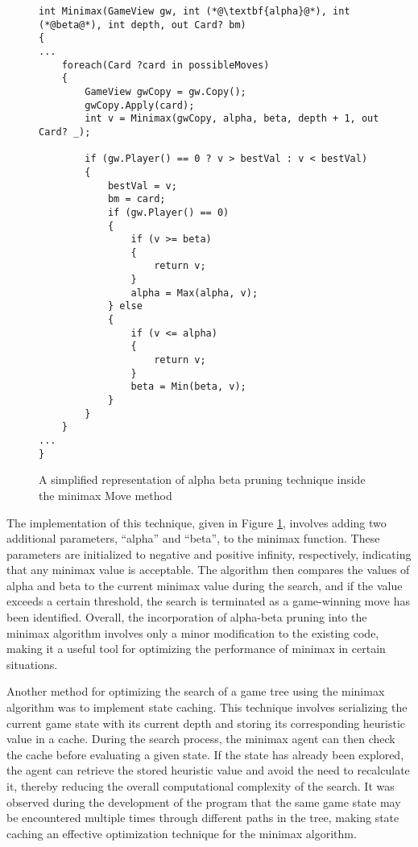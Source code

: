 \begin{figure}[h]
\captionsetup{justification=centering}
\begin{lstlisting}
int Minimax(GameView gw, int (*@\textbf{alpha}@*), int (*@beta@*), int depth, out Card? bm)
{
...
	foreach(Card ?card in possibleMoves)
	{
		GameView gwCopy = gw.Copy();
		gwCopy.Apply(card);
		int v = Minimax(gwCopy, alpha, beta, depth + 1, out Card? _);

		if (gw.Player() == 0 ? v > bestVal : v < bestVal)
		{
			bestVal = v;
			bm = card;
			if (gw.Player() == 0)
			{
				if (v >= beta)
				{
					return v;
				}
				alpha = Max(alpha, v);
			} else
			{
				if (v <= alpha)
				{
					return v;
				}
				beta = Min(beta, v);
			}
		}
	}
...
}
\end{lstlisting}
\caption{A simplified representation of alpha beta pruning technique inside the minimax Move method}
\label{fig:alphabeta}
\end{figure}

The implementation of this technique, given in Figure \ref{fig:alphabeta}, involves adding two additional parameters, ``alpha'' and ``beta'', to the minimax function. These parameters are initialized to negative and positive infinity, respectively, indicating that any minimax value is acceptable. The algorithm then compares the values of alpha and beta to the current minimax value during the search, and if the value exceeds a certain threshold, the search is terminated as a game-winning move has been identified. Overall, the incorporation of alpha-beta pruning into the minimax algorithm involves only a minor modification to the existing code, making it a useful tool for optimizing the performance of minimax in certain situations.

Another method for optimizing the search of a game tree using the minimax algorithm was to implement state caching. This technique involves serializing the current game state with its current depth and storing its corresponding heuristic value in a cache. During the search process, the minimax agent can then check the cache before evaluating a given state. If the state has already been explored, the agent can retrieve the stored heuristic value and avoid the need to recalculate it, thereby reducing the overall computational complexity of the search. It was observed during the development of the program that the same game state may be encountered multiple times through different paths in the tree, making state caching an effective optimization technique for the minimax algorithm.

